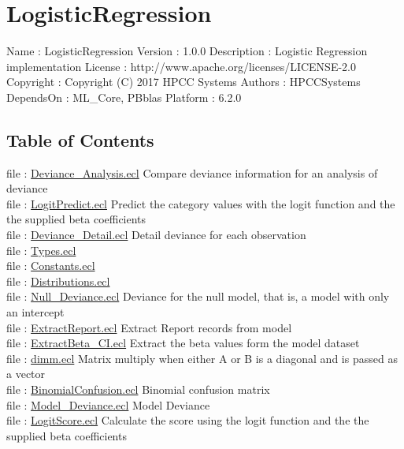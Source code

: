 \chapter*{LogisticRegression}
\hypertarget{LogisticRegression}{}

Name : LogisticRegression
Version : 1.0.0
Description : Logistic Regression implementation
License : http://www.apache.org/licenses/LICENSE-2.0
Copyright : Copyright (C) 2017 HPCC Systems
Authors : HPCCSystems
DependsOn : ML\_Core, PBblas
Platform : 6.2.0

\section*{Table of Contents}
file : \hyperlink{LogisticRegression.Deviance_Analysis}{Deviance\_Analysis.ecl}  Compare deviance information for an analysis of deviance \\
file : \hyperlink{LogisticRegression.LogitPredict}{LogitPredict.ecl}  Predict the category values with the logit function and the the supplied beta coefficients \\
file : \hyperlink{LogisticRegression.Deviance_Detail}{Deviance\_Detail.ecl}  Detail deviance for each observation \\
file : \hyperlink{LogisticRegression.Types}{Types.ecl}   \\
file : \hyperlink{LogisticRegression.Constants}{Constants.ecl}   \\
file : \hyperlink{LogisticRegression.Distributions}{Distributions.ecl}   \\
file : \hyperlink{LogisticRegression.Null_Deviance}{Null\_Deviance.ecl}  Deviance for the null model, that is, a model with only an intercept \\
file : \hyperlink{LogisticRegression.ExtractReport}{ExtractReport.ecl}  Extract Report records from model \\
file : \hyperlink{LogisticRegression.ExtractBeta_CI}{ExtractBeta\_CI.ecl}  Extract the beta values form the model dataset \\
file : \hyperlink{LogisticRegression.dimm}{dimm.ecl}  Matrix multiply when either A or B is a diagonal and is passed as a vector \\
file : \hyperlink{LogisticRegression.BinomialConfusion}{BinomialConfusion.ecl}  Binomial confusion matrix \\
file : \hyperlink{LogisticRegression.Model_Deviance}{Model\_Deviance.ecl}  Model Deviance \\
file : \hyperlink{LogisticRegression.LogitScore}{LogitScore.ecl}  Calculate the score using the logit function and the the supplied beta coefficients \\
